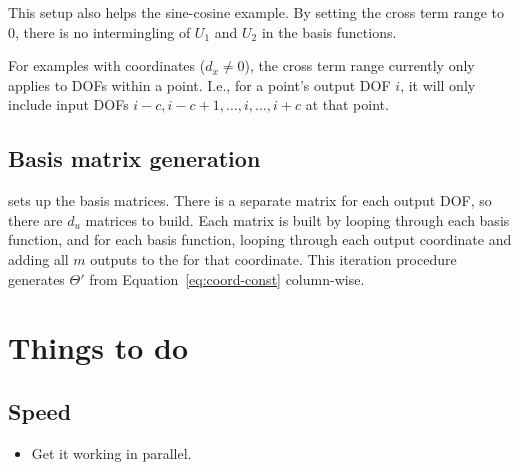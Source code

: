\documentclass{article}
\def\lstinline#1{}%
\begin{document}
This setup also helps the sine-cosine example. By setting the cross term range
to 0, there is no intermingling of $U_1$ and $U_2$ in the basis functions.

For examples with coordinates ($d_x \ne 0$), the cross term range currently only
applies to DOFs within a point. I.e., for a point's output DOF $i$, it will only
include input DOFs $i-c,i-c+1,\hdots,i,\hdots,i+c$ at that point.

\subsection{Basis matrix generation}

\lstinline{SINDyBasisAddVariables} sets up the basis matrices. There is a
separate matrix for each output DOF, so there are $d_u$ matrices to build.
Each matrix is built by looping through each basis function, and for each basis function,
looping through each output coordinate and adding all $m$ outputs to the for that coordinate.
This iteration procedure generates $\Theta'$ from Equation~\ref{eq:coord-const} column-wise.

\section{Things to do}

\subsection{Speed}
\begin{itemize}
    \item Get it working in parallel.
\end{itemize}
\end{document}

